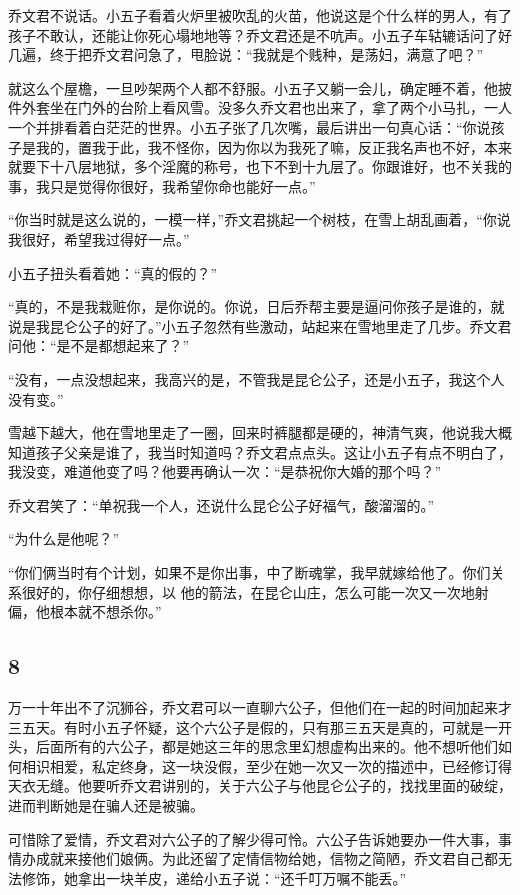 乔文君不说话。小五子看着火炉里被吹乱的火苗，他说这是个什么样的男人，有了孩子不敢认，还能让你死心塌地地等？乔文君还是不吭声。小五子车轱辘话问了好几遍，终于把乔文君问急了，甩脸说：“我就是个贱种，是荡妇，满意了吧？”

就这么个屋檐，一旦吵架两个人都不舒服。小五子又躺一会儿，确定睡不着，他披件外套坐在门外的台阶上看风雪。没多久乔文君也出来了，拿了两个小马扎，一人一个并排看着白茫茫的世界。小五子张了几次嘴，最后讲出一句真心话：“你说孩子是我的，置我于此，我不怪你，因为你以为我死了嘛，反正我名声也不好，本来就要下十八层地狱，多个淫魔的称号，也下不到十九层了。你跟谁好，也不关我的事，我只是觉得你很好，我希望你命也能好一点。”

“你当时就是这么说的，一模一样，”乔文君挑起一个树枝，在雪上胡乱画着，“你说我很好，希望我过得好一点。”

小五子扭头看着她：“真的假的？”

“真的，不是我栽赃你，是你说的。你说，日后乔帮主要是逼问你孩子是谁的，就说是我昆仑公子的好了。”小五子忽然有些激动，站起来在雪地里走了几步。乔文君问他：“是不是都想起来了？”

“没有，一点没想起来，我高兴的是，不管我是昆仑公子，还是小五子，我这个人没有变。”

雪越下越大，他在雪地里走了一圈，回来时裤腿都是硬的，神清气爽，他说我大概知道孩子父亲是谁了，我当时知道吗？乔文君点点头。这让小五子有点不明白了，我没变，难道他变了吗？他要再确认一次：“是恭祝你大婚的那个吗？”

乔文君笑了：“单祝我一个人，还说什么昆仑公子好福气，酸溜溜的。”

“为什么是他呢？”

“你们俩当时有个计划，如果不是你出事，中了断魂掌，我早就嫁给他了。你们关系很好的，你仔细想想，以
他的箭法，在昆仑山庄，怎么可能一次又一次地射偏，他根本就不想杀你。”
\newline

{\centering\subsection{8}}

万一十年出不了沉狮谷，乔文君可以一直聊六公子，但他们在一起的时间加起来才三五天。有时小五子怀疑，这个六公子是假的，只有那三五天是真的，可就是一开头，后面所有的六公子，都是她这三年的思念里幻想虚构出来的。他不想听他们如何相识相爱，私定终身，这一块没假，至少在她一次又一次的描述中，已经修订得天衣无缝。他要听乔文君讲别的，关于六公子与他昆仑公子的，找找里面的破绽，进而判断她是在骗人还是被骗。

可惜除了爱情，乔文君对六公子的了解少得可怜。六公子告诉她要办一件大事，事情办成就来接他们娘俩。为此还留了定情信物给她，信物之简陋，乔文君自己都无法修饰，她拿出一块羊皮，递给小五子说：“还千叮万嘱不能丢。”

